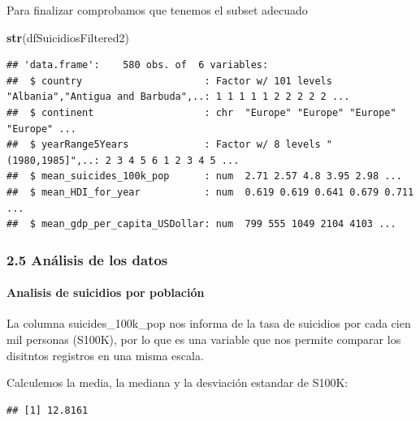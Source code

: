 \documentclass[]{article}
\newenvironment{Shaded}{\begin{snugshade}}{\end{snugshade}}
\newcommand{\KeywordTok}[1]{\textcolor[rgb]{0.13,0.29,0.53}{\textbf{#1}}}
\newcommand{\NormalTok}[1]{#1}
\newcommand{\OperatorTok}[1]{\textcolor[rgb]{0.81,0.36,0.00}{\textbf{#1}}}
\let\oldparagraph\paragraph
\renewcommand{\paragraph}[1]{\oldparagraph{#1}\mbox{}}
\begin{document}
Para finalizar comprobamos que tenemos el subset adecuado

\begin{Shaded}
\begin{Highlighting}[]
\KeywordTok{str}\NormalTok{(dfSuicidiosFiltered2)}
\end{Highlighting}
\end{Shaded}

\begin{verbatim}
## 'data.frame':    580 obs. of  6 variables:
##  $ country                     : Factor w/ 101 levels "Albania","Antigua and Barbuda",..: 1 1 1 1 1 2 2 2 2 2 ...
##  $ continent                   : chr  "Europe" "Europe" "Europe" "Europe" ...
##  $ yearRange5Years             : Factor w/ 8 levels "(1980,1985]",..: 2 3 4 5 6 1 2 3 4 5 ...
##  $ mean_suicides_100k_pop      : num  2.71 2.57 4.8 3.95 2.98 ...
##  $ mean_HDI_for_year           : num  0.619 0.619 0.641 0.679 0.711 ...
##  $ mean_gdp_per_capita_USDollar: num  799 555 1049 2104 4103 ...
\end{verbatim}

\hypertarget{analisis-de-los-datos}{%
\subsubsection{2.5 Análisis de los datos}\label{analisis-de-los-datos}}

\hypertarget{analisis-de-suicidios-por-poblacion}{%
\paragraph{Analisis de suicidios por
población}\label{analisis-de-suicidios-por-poblacion}}

La columna suicides\_100k\_pop nos informa de la tasa de suicidios por
cada cien mil personas (S100K), por lo que es una variable que nos
permite comparar los disitntos registros en una misma escala.

Calculemos la media, la mediana y la desviación estandar de S100K:

\begin{Shaded}
\end{Shaded}

\begin{verbatim}
## [1] 12.8161
\end{verbatim}
\end{document}
